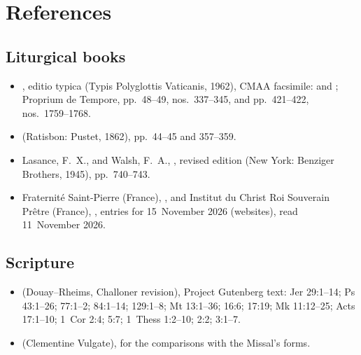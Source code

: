 \section{References}
\label{sec:references}

{\small
\subsection*{Liturgical books}
\begin{itemize}[leftmargin=1.2em,itemsep=.25em]
\item {}, editio typica (Typis
Polyglottis Vaticanis, 1962), CMAA facsimile:  and
; Proprium de Tempore, pp.~48--49,
nos.~337--345, and pp.~421--422, nos.~1759--1768.
\item {} (Ratisbon: Pustet, 1862), pp.~44--45 and
357--359.
\item Lasance, F.~X., and Walsh, F.~A., , revised edition (New York: Benziger Brothers, 1945), pp.~740--743.
\item Fraternité Saint-Pierre (France), , and Institut du
Christ Roi Souverain Prêtre (France), , entries for 15~November
2026 (websites), read 11~November 2026.
\end{itemize}

\subsection*{Scripture}
\begin{itemize}[leftmargin=1.2em,itemsep=.25em]
\item {} (Douay--Rheims,
Challoner revision), Project Gutenberg text: Jer 29:1--14; Ps 43:1--26;
77:1--2; 84:1--14; 129:1--8; Mt 13:1--36; 16:6; 17:19; Mk 11:12--25;
Acts 17:1--10; 1~Cor 2:4; 5:7; 1~Thess 1:2--10; 2:2; 3:1--7.
\item {} (Clementine Vulgate), for the
comparisons with the Missal's forms.
\end{itemize}

}
